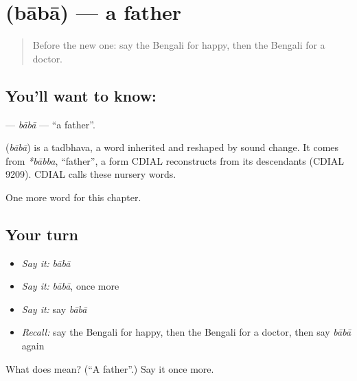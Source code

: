 \section[\texorpdfstring{\bn{বাবা} (bābā)}{বাবা (bābā)}]{ (bābā) — a father}

\label{lesson:BN-C45-baba}



\begin{quote}
Before the new one: say the Bengali for happy, then the Bengali for a doctor.
\end{quote}

\subsection*{You'll want to know: }
\textbf{} — \emph{bābā} — \textquotedblleft{}a father\textquotedblright{}.

\begin{cousinweb}
\textbf{} (\emph{bābā}) is a tadbhava, a word inherited and reshaped by sound change. It comes from \emph{*bābba}, \textquotedblleft{}father\textquotedblright{}, a form CDIAL reconstructs from its descendants (CDIAL 9209). CDIAL calls these nursery words.
\end{cousinweb}

\begin{grammarlens}[title={What you've built}]
One more word for this chapter.
\end{grammarlens}

\subsection*{Your turn}
\begin{itemize}
\raggedright
  \item \emph{Say it:} \emph{bābā}
  \item \emph{Say it:} \emph{bābā}, once more
  \item \emph{Say it:} say \emph{bābā}
  \item \emph{Recall:} say the Bengali for happy, then the Bengali for a doctor, then say \emph{bābā} again
\end{itemize}

\begin{tcolorbox}[breakable,colback=teal!4,colframe=teal!35!black,title={Before you move on}]
What does  mean? (\textquotedblleft{}A father\textquotedblright{}.) Say it once more.
\end{tcolorbox}
